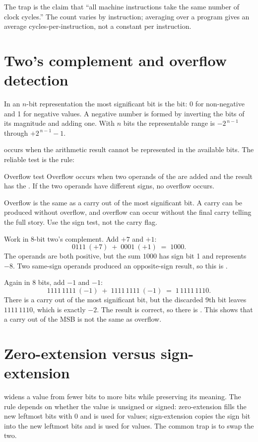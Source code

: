 The trap is the claim that ``all machine instructions take the same number of
clock cycles.'' The count varies by instruction; averaging over a program
gives an average cycles-per-instruction, not a constant per instruction.

\section{Two's complement and overflow detection}
In an $n$-bit  representation the most significant bit
is the  bit: 0 for non-negative and 1 for negative values. A
negative number is formed by inverting the bits of its magnitude and adding
one. With $n$ bits the representable range is
$-2^{\,n-1}$ through $+2^{\,n-1}-1$.

 occurs when the arithmetic result cannot be represented in the
available bits. The reliable test is the  rule:

\begin{definitionbox}{Overflow test}
Overflow occurs when two operands of the  are added and the
result has the . If the two operands have different signs,
no overflow occurs.
\end{definitionbox}

Overflow is  the same as a carry out of the most significant bit. A
carry can be produced without overflow, and overflow can occur without the
final carry telling the full story. Use the sign test, not the carry flag.

\begin{example}[Overflow]
Work in 8-bit two's complement. Add $+7$ and $+1$:
\[
0111\ (+\!7) \;+\; 0001\ (+\!1) \;=\; 1000.
\]
The operands are both positive, but the sum $1000$ has sign bit 1 and
represents $-8$. Two same-sign operands produced an opposite-sign result, so
this is .
\end{example}

\begin{example}
Again in 8 bits, add $-1$ and $-1$:
\[
1111\,1111\ (-\!1) \;+\; 1111\,1111\ (-\!1) \;=\; 1\,1111\,1110.
\]
There is a carry out of the most significant bit, but the discarded 9th bit
leaves $1111\,1110$, which is exactly $-2$. The result is correct, so there is
. This shows that a carry out of the MSB is not the same as
overflow.
\end{example}

\section{Zero-extension versus sign-extension}
 widens a value from fewer bits to more bits while preserving
its meaning. The rule depends on whether the value is unsigned or signed:
zero-extension fills the new leftmost bits with 0 and is used for
 values; sign-extension copies the sign bit into the new
leftmost bits and is used for  values. The common trap is to swap
the two.

